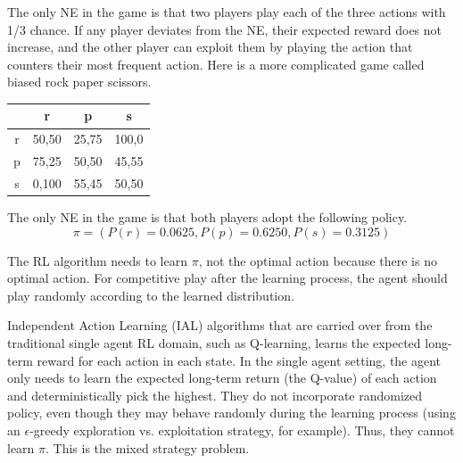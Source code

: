 \documentclass[a4paper]{article}
\begin{document}
\begin{multicols}{2}
The only NE in the game is that two players play each of the three actions with 1/3 chance. If any player deviates from the NE, their expected reward does not increase, and the other player can exploit them by playing the action that counters their most frequent action. Here is a more complicated game called biased rock paper scissors.

\noindent
\begin{minipage}{\columnwidth}
\label{table:biased_rps}
\centering
\begin{tabular}{c|ccc}
    & r & p & s\\
    \hline
    r & 50,50 & 25,75 & 100,0 \\
    p & 75,25 & 50,50 & 45,55 \\
    s & 0,100 & 55,45 & 50,50 \\
\end{tabular}
\end{minipage}

The only NE in the game is that both players adopt the following policy.
\begin{equation}
\pi=(P(r)=0.0625,P(p)=0.6250,P(s)=0.3125)
\label{eq:biased_rps_policy}
\end{equation}

The RL algorithm needs to learn $\pi$, not the optimal action because there is no optimal action. For competitive play after the learning process, the agent should play randomly according to the learned distribution.

Independent Action Learning (IAL) algorithms that are carried over from the traditional single agent RL domain, such as Q-learning, learns the expected long-term reward for each action in each state. In the single agent setting, the agent only needs to learn the expected long-term return (the Q-value) of each action and deterministically pick the highest. They do not incorporate randomized policy, even though they may behave randomly during the learning process (using an $\epsilon$-greedy exploration vs. exploitation strategy, for example). Thus, they cannot learn $\pi$. This is the mixed strategy problem.


\end{multicols}
\end{document}

